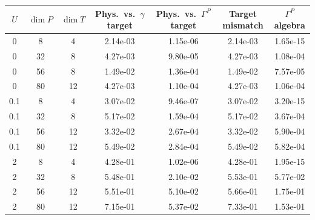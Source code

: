 \begin{tabular}{ccccccc}
\hline
$U$ & $\dim P$ & $\dim T$ & Phys.\ vs.\ $\gamma$ target & Phys.\ vs.\ $\Gamma^P$ target & Target mismatch & $\Gamma^P$ algebra \\
\hline
0 & 8 & 4 & 2.14e-03 & 1.15e-06 & 2.14e-03 & 1.65e-15 \\
0 & 32 & 8 & 4.27e-03 & 9.80e-05 & 4.27e-03 & 1.08e-04 \\
0 & 56 & 8 & 1.49e-02 & 1.36e-04 & 1.49e-02 & 7.57e-05 \\
0 & 80 & 12 & 4.27e-03 & 1.10e-04 & 4.27e-03 & 1.06e-04 \\
\hline
0.1 & 8 & 4 & 3.07e-02 & 9.46e-07 & 3.07e-02 & 3.20e-15 \\
0.1 & 32 & 8 & 5.17e-02 & 1.59e-04 & 5.17e-02 & 3.67e-04 \\
0.1 & 56 & 12 & 3.32e-02 & 2.67e-04 & 3.32e-02 & 5.90e-04 \\
0.1 & 80 & 12 & 5.49e-02 & 2.84e-04 & 5.49e-02 & 5.82e-04 \\
\hline
2 & 8 & 4 & 4.28e-01 & 1.02e-06 & 4.28e-01 & 1.95e-15 \\
2 & 32 & 8 & 5.48e-01 & 2.10e-02 & 5.53e-01 & 5.77e-02 \\
2 & 56 & 12 & 5.51e-01 & 5.10e-02 & 5.66e-01 & 1.75e-01 \\
2 & 80 & 12 & 7.15e-01 & 5.37e-02 & 7.33e-01 & 1.53e-01 \\
\hline
\end{tabular}
